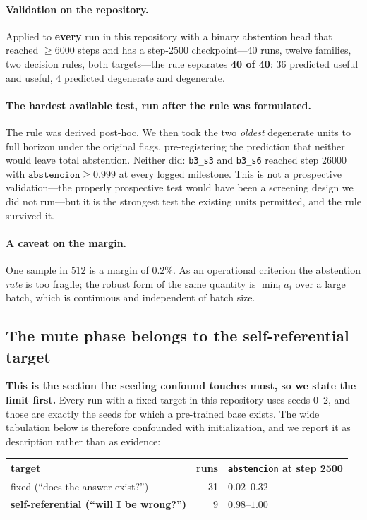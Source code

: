 \documentclass[11pt,a4paper]{article}
\begin{document}
\paragraph{Validation on the repository.} Applied to \textbf{every} run in this repository with a
binary abstention head that reached $\geq 6000$ steps and has a step-$2500$ checkpoint---$40$ runs,
twelve families, two decision rules, both targets---the rule separates \textbf{40 of 40}: $36$
predicted useful and useful, $4$ predicted degenerate and degenerate.

\paragraph{The hardest available test, run after the rule was formulated.} The rule was derived
post-hoc. We then took the two \emph{oldest} degenerate units to full horizon under the original
flags, pre-registering the prediction that neither would leave total abstention. Neither did:
\texttt{b3\_s3} and \texttt{b3\_s6} reached step $26000$ with $\texttt{abstencion} \geq 0.999$ at
every logged milestone. This is not a prospective validation---the properly prospective test would
have been a screening design we did not run---but it is the strongest test the existing units
permitted, and the rule survived it.

\paragraph{A caveat on the margin.} One sample in $512$ is a margin of $0.2\%$. As an operational
criterion the abstention \emph{rate} is too fragile; the robust form of the same quantity is
$\min_i a_i$ over a large batch, which is continuous and independent of batch size.

\subsection{The mute phase belongs to the self-referential target}
\label{sec:exclusiva}

\textbf{This is the section the seeding confound touches most, so we state the limit first.} Every
run with a fixed target in this repository uses seeds $0$--$2$, and those are exactly the seeds for
which a pre-trained base exists. The wide tabulation below is therefore confounded with
initialization, and we report it as description rather than as evidence:

\begin{center}
\begin{tabular}{lrl}
\toprule
target & runs & \texttt{abstencion} at step 2500 \\
\midrule
fixed (``does the answer exist?'') & 31 & $0.02$--$0.32$ \\
\textbf{self-referential (``will I be wrong?'')} & 9 & $\mathbf{0.98}$--$\mathbf{1.00}$ \\
\bottomrule
\end{tabular}
\end{center}
\end{document}
